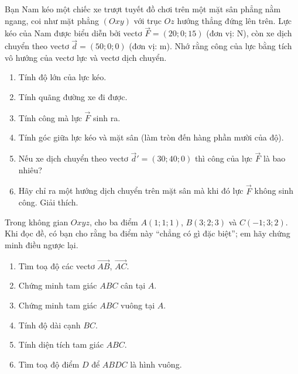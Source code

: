 \begin{bai}Bạn Nam kéo một chiếc xe trượt tuyết đồ chơi trên một mặt sân phẳng nằm ngang, coi như mặt phẳng $(Oxy)$ với trục $Oz$ hướng thẳng đứng lên trên. Lực kéo của Nam được biểu diễn bởi vectơ $\vec F=(20;0;15)$ (đơn vị: N), còn xe dịch chuyển theo vectơ $\vec d=(50;0;0)$ (đơn vị: m). Nhớ rằng công của lực bằng tích vô hướng của vectơ lực và vectơ dịch chuyển.
\begin{enumerate}[label=\alph*)]
\item Tính độ lớn của lực kéo.
\item Tính quãng đường xe đi được.
\item Tính công mà lực $\vec F$ sinh ra.
\item Tính góc giữa lực kéo và mặt sân (làm tròn đến hàng phần mười của độ).
\item Nếu xe dịch chuyển theo vectơ $\vec d'=(30;40;0)$ thì công của lực $\vec F$ là bao nhiêu?
\item Hãy chỉ ra một hướng dịch chuyển trên mặt sân mà khi đó lực $\vec F$ không sinh công. Giải thích.
\end{enumerate}
\end{bai}

\begin{bai}Trong không gian $Oxyz$, cho ba điểm $A(1;1;1)$, $B(3;2;3)$ và $C(-1;3;2)$. Khi đọc đề, có bạn cho rằng ba điểm này “chẳng có gì đặc biệt”; em hãy chứng minh điều ngược lại.
\begin{enumerate}[label=\alph*)]
\item Tìm toạ độ các vectơ $\overrightarrow{AB}$, $\overrightarrow{AC}$.
\item Chứng minh tam giác $ABC$ cân tại $A$.
\item Chứng minh tam giác $ABC$ vuông tại $A$.
\item Tính độ dài cạnh $BC$.
\item Tính diện tích tam giác $ABC$.
\item Tìm toạ độ điểm $D$ để $ABDC$ là hình vuông.
\end{enumerate}
\end{bai}
